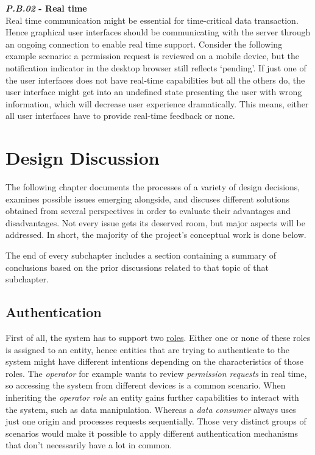 \documentclass[12pt,english,a4paper,titlepage,cleardoublepage=empty,dottedtoc]{report}
\begin{document}
\textbf{\emph{\protect\hypertarget{pb02}{}{P.B.02}} - Real time}\\
Real time communication might be essential for time-critical data
transaction. Hence graphical user interfaces should be communicating
with the server through an ongoing connection to enable real time
support. Consider the following example scenario: a permission request
is reviewed on a mobile device, but the notification indicator in the
desktop browser still reflects `pending'. If just one of the user
interfaces does not have real-time capabilities but all the others do,
the user interface might get into an undefined state presenting the user
with wrong information, which will decrease user experience
dramatically. This means, either all user interfaces have to provide
real-time feedback or none.

\hypertarget{design-discussion}{\chapter{Design
Discussion}\label{design-discussion}}

The following chapter documents the processes of a variety of design
decisions, examines possible issues emerging alongside, and discuses
different solutions obtained from several perspectives in order to
evaluate their advantages and disadvantages. Not every issue gets its
deserved room, but major aspects will be addressed. In short, the
majority of the project's conceptual work is done below.

The end of every subchapter includes a section containing a summary of
conclusions based on the prior discussions related to that topic of that
subchapter.

\hypertarget{authentication}{\section{Authentication}\label{authentication}}

First of all, the system has to support two
\protect\hyperlink{sa03}{roles}. Either one or none of these roles is
assigned to an entity, hence entities that are trying to authenticate to
the system might have different intentions depending on the
characteristics of those roles. The \emph{operator} for example wants to
review \emph{permission requests} in real time, so accessing the system
from different devices is a common scenario. When inheriting the
\emph{operator role} an entity gains further capabilities to interact
with the system, such as data manipulation. Whereas a \emph{data
consumer} always uses just one origin and processes requests
sequentially. Those very distinct groups of scenarios would make it
possible to apply different authentication mechanisms that don't
necessarily have a lot in common.
\end{document}
